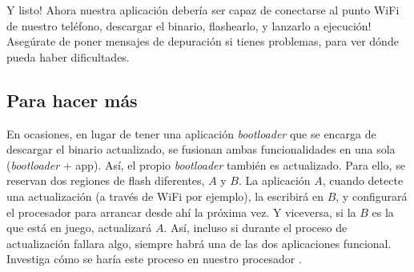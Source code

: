 \documentclass[../main.tex]{subfiles}
\begin{document}
            Y listo! Ahora nuestra aplicación debería ser capaz de conectarse al punto WiFi de nuestro teléfono, descargar el binario, flashearlo, y lanzarlo a ejecución! Asegúrate de poner mensajes de depuración si tienes problemas, para ver dónde pueda haber dificultades.

    \subsection{Para hacer más}

        En ocasiones, en lugar de tener una aplicación \emph{bootloader} que se encarga de descargar el binario actualizado, se fusionan ambas funcionalidades en una sola (\emph{bootloader} + app). Así, el propio \emph{bootloader} también es actualizado. Para ello, se reservan dos regiones de flash diferentes, $A$ y $B$. La aplicación $A$, cuando detecte una actualización (a través de WiFi por ejemplo), la escribirá en $B$, y configurará el procesador para arrancar desde ahí la próxima vez. Y viceversa, si la $B$ es la que está en juego, actualizará $A$. Así, incluso si durante el proceso de actualización fallara algo, siempre habrá una de las dos aplicaciones funcional. Investiga cómo se haría este proceso en nuestro procesador \MCU.
\end{document}

